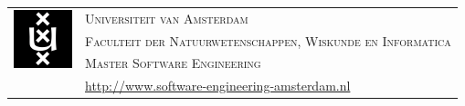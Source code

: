\documentclass{article}
\begin{document}
\begin{titlepage}
        \vspace*{\fill}

        \begin{center}
            \begin{tabular}{r|l}
                \multirow{3}{*}{\includegraphics[height=48pt]{uva_small.png}}
                &\textsc{\Large Universiteit van Amsterdam}\\
                &\textsc{Faculteit der Natuurwetenschappen, Wiskunde en Informatica}\\
                &\textsc{Master Software Engineering}\\
                &\url{http://www.software-engineering-amsterdam.nl}
            \end{tabular}
        \end{center}

    \end{titlepage}
\end{document}
